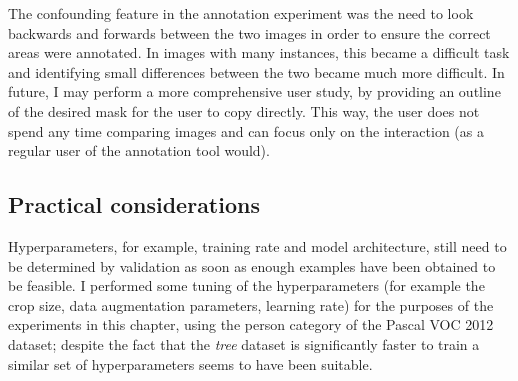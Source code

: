 \begin{table*}[!ht]
  \centering
    \caption{Statistics from annotating the set with polygons, lines and then by refining model predictions. Precision, recall and IOU are a comparison with the original validation set. Note figures in brackets are the original statistics of the unmodified predictions from the model}

\noindent{}

\label{tab:annotation_exp}
\end{table*}


The confounding feature in the annotation experiment was the need to look backwards and forwards between the two images in order to ensure the correct areas were annotated. In images with many instances, this became a difficult task and identifying small differences between the two became much more difficult. In future, I may perform a more comprehensive user study, by providing an outline of the desired mask for the user to copy directly. This way, the user does not spend any time comparing images and can focus only on the interaction (as a regular user of the annotation tool would).


\subsection{Practical considerations}

Hyperparameters, for example, training rate and model architecture, still need to be determined by validation as soon as enough examples have been obtained to be feasible. I performed some tuning of the hyperparameters (for example the crop size, data augmentation parameters, learning rate) for the purposes of the experiments in this chapter, using the person category of the Pascal \gls{VOC} 2012 dataset; despite the fact that the \emph{tree} dataset is significantly faster to train a similar set of hyperparameters seems to have been suitable.


